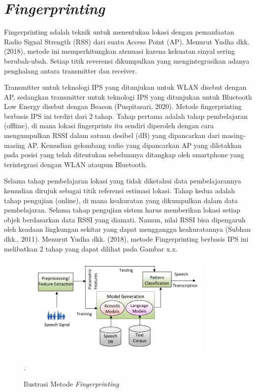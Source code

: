 \section{\textit{Fingerprinting}}
Fingerprinting adalah teknik untuk menentukan lokasi dengan pemanfaatan Radio Signal Strength (RSS) dari suatu Access Point (AP). Menurut Yudha dkk. (2018), metode ini memperhitungkan atenuasi karena kekuatan sinyal sering berubah-ubah. Setiap titik reverensi dikumpulkan yang mengintegrasikan adanya penghalang antara transmitter dan receiver.

\par Transmitter untuk teknologi IPS yang ditunjukan untuk WLAN disebut dengan AP, sedangkan transmitter untuk teknologi IPS yang ditunjukan untuk Bluetooth Low Energy disebut dengan Beacon (Puspitasari, 2020). Metode fingerprinting berbasis IPS ini terdiri dari 2 tahap. Tahap pertama adalah tahap pembelajaran (offline), di mana lokasi fingerprints itu sendiri diperoleh dengan cara mengumpulkan RSSI dalam satuan desibel (dB) yang dipancarkan dari masing-masing AP. Kemudian gelombang radio yang dipancarkan AP yang diletakkan pada posisi yang telah ditentukan sebelumnya ditangkap oleh smartphone yang terintegrasi dengan WLAN ataupun Bluetooth.

\par Selama tahap pembelajaran lokasi yang tidak diketahui data pembelajarannya kemudian dirujuk sebagai titik referensi estimasi lokasi. Tahap kedua adalah tahap pengujian (online), di mana keakuratan yang dikumpulkan dalam data pembelajaran. Selama tahap pengujian sistem harus memberikan lokasi setiap objek berdasarkan data RSSI yang diamati. Namun, nilai RSSI bisa dipengaruh oleh keadaan lingkungan sekitar yang dapat mengganggu keakuratannya (Subhan dkk., 2011). Menurut Yudha dkk. (2018), metode Fingerprinting berbasis IPS ini melibatkan 2 tahap yang dapat dilihat pada Gambar x.x.

\begin{figure}[H]
\centering
\shadowbox
{\includegraphics [width = 10cm, height= 5cm]{gambar/sr_arsitektur}}
\caption{Ilustrasi Metode \textit{Fingerprinting} \citep{aggarwal2012}}.
\label{sr_arsitektur}
\end{figure}

